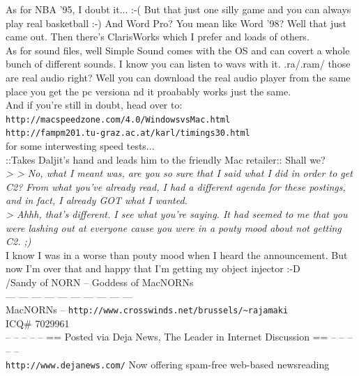 \documentclass[11pt,twoside,a4paper]{article}
\begin{document}
\begin{multicols*}{2}
As for NBA '95, I doubt it...  :-( But that just one silly game and you can always play real basketball :-) And Word Pro? You mean like Word '98? Well that just came out. Then there's ClarisWorks which I prefer and loads of others.~\\

As for sound files, well Simple Sound comes with the OS and can covert a whole bunch of different sounds. I know you can listen to wavs with it. .ra/.ram/ those are real audio right? Well you can download the real audio player from the same place you get the pc versiona nd it proabably works just the same.~\\

And if you're still in doubt, head over to:~\\
\texttt{http://macspeedzone.com/4.0/WindowsvsMac.html}~\\
\texttt{http://fampm201.tu-graz.ac.at/karl/timings30.html}~\\

for some interwesting speed tests...~\\

::Takes Daljit's hand and leads him to the friendly Mac retailer:: Shall we?~\\

\emph{> > No, what I meant was, are you so sure that I said what I did in order to get C2? From what you've already read, I had a different agenda for these postings, and in fact, I already GOT what I wanted. }~\\

\emph{> Ahhh, that's different.  I see what you're saying. It had seemed to me that you were lashing out at everyone cause you were in a pouty mood about not getting C2.  ;)}~\\

I know I was in a worse than pouty mood when I heard the announcement. But now I'm over that and happy that I'm getting my object injector :-D~\\

/Sandy of NORN -- Goddess of MacNORNs~\\
--- --- --- --- --- --- --- --- --- ---~\\
MacNORNs -- \texttt{http://www.crosswinds.net/brussels/\textasciitilde rajamaki}~\\
ICQ\# 7029961~\\

-- -- -- -- -- == Posted via Deja News, The Leader in Internet Discussion == -- -- -- -- -- ~\\
\texttt{http://www.dejanews.com/}   Now offering spam-free web-based newsreading~\\


\end{multicols*}
\end{document}

